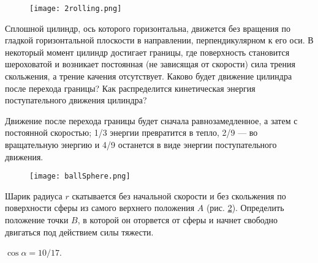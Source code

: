 \begin{figure}[h]
\centering
\texttt{[image: 2rolling.png]}
\caption{}
\label{2rolling}
\end{figure}

\begin{ex} %
Сплошной цилиндр, ось которого горизонтальна, движется без вращения по гладкой горизонтальной плоскости в направлении, перпендикулярном к его оси. В некоторый момент цилиндр достигает границы, где поверхность становится шероховатой и возникает постоянная (не зависящая от скорости) сила трения скольжения, а трение качения отсутствует. Каково будет движение цилиндра после перехода границы? Как распределится кинетическая энергия поступательного движения цилиндра?
\begin{ans}
Движение после перехода границы будет сначала равнозамедленное, а затем с постоянной скоростью; 1/3 энергии превратится в тепло, 2/9 — во вращательную энергию и 4/9 останется в виде энергии поступательного движения.
\end{ans}
\end{ex}	

\begin{ex} %

\begin{figure}[h]
\centering
\texttt{[image: ballSphere.png]}
\caption{}
\label{ballSphere}
\end{figure}

Шарик радиуса $r$ скатывается без начальной скорости и без скольжения по поверхности сферы из самого верхнего положения $A$ (рис. \ref{ballSphere}). Определить положение точки $B$, в которой он оторвется от сферы и начнет свободно двигаться под действием силы тяжести.
\begin{ans}
$\cos \alpha = 10/17$.
\end{ans}
\end{ex}	

\clearpage